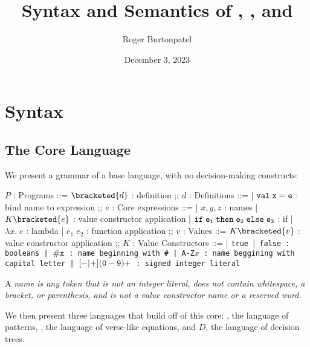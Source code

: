 \documentclass[]{article}
\title{Syntax and Semantics of \Vminus, \Pplus, and \D}
\author{Roger Burtonpatel}
\date{December 3, 2023}
\begin{document}
\maketitle

\section{Syntax}

\subsection{The Core Language}

We present a grammar of a base language, with no decision-making constructs: 

\bigskip

\begin{center}
    \begin{bnf}
    $P$ : \textsf{Programs} ::=
    $\bracketed{d}$ : definition
    ;;
    $d$ : \textsf{Definitions} ::=
    | $\tt{val} \; x \; \tt{=} \; e$ : bind name to expression
    ;;
    $e$ : Core expressions ::= 
    | $x, y, z$ : names
    | $K\bracketed{e}$ : value constructor application 
    | $\tt{if} \; e_{1} \; \tt{then} \; e_{2} \; \tt{else} \; e_{3} $ : if
    | $\lambda x. \; e$ : lambda 
    | $e_{1} \; e_{2}$ : function application 
    ;;
    $v$ : Values ::= $K\bracketed{v}$ : value constructor application 
    ;;
    $K$ : \textsf{Value Constructors} ::=
    | \tt{true} $\vert$ \tt{false} : booleans
    | $\tt{\#}x$ : name beginning with \tt{\#}
    | \tt{A-Z}$x$ : name beggining with capital letter
    | $[\tt{-}\vert\tt{+}](\tt{0}-\tt{9})+$ : signed integer literal 

    \end{bnf}
\end{center}


A \it{name} is any token that is not an integer literal, 
does not contain whitespace, a bracket, or parenthesis, 
and is not a value constructor name or a reserved word.


We then present three languages that build off of this core: 
\Pplus, the language of patterns, \Vminus, the language of 
verse-like equations, and $D$, the language of decision trees. 
\end{document}
